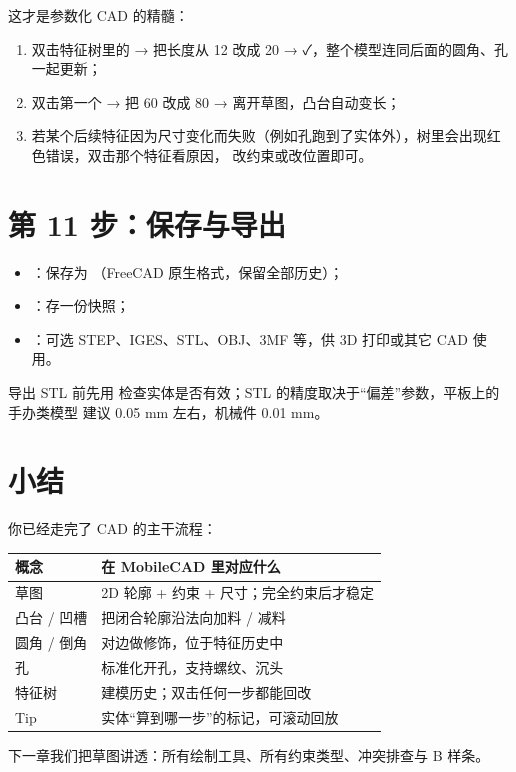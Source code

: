 这才是参数化 CAD 的精髓：

\begin{enumerate}
  \item 双击特征树里的  → 把长度从 12 改成 20 → ✓，整个模型连同后面的圆角、孔一起更新；
  \item 双击第一个  → 把 60 改成 80 → 离开草图，凸台自动变长；
  \item 若某个后续特征因为尺寸变化而失败（例如孔跑到了实体外），树里会出现红色错误，双击那个特征看原因，
        改约束或改位置即可。
\end{enumerate}

\section{第 11 步：保存与导出}

\begin{itemize}
  \item {}：保存为 （FreeCAD 原生格式，保留全部历史）；
  \item {}：存一份快照；
  \item {}：可选 STEP、IGES、STL、OBJ、3MF 等，供 3D 打印或其它 CAD 使用。
\end{itemize}

\begin{tip}[给 3D 打印的建议]
导出 STL 前先用  检查实体是否有效；STL 的精度取决于“偏差”参数，平板上的手办类模型
建议 0.05 mm 左右，机械件 0.01 mm。
\end{tip}

\section{小结}

你已经走完了 CAD 的主干流程：

\begin{center}
\small
\begin{tabularx}{\linewidth}{@{}lX@{}}
\toprule
\textbf{概念} & \textbf{在 MobileCAD 里对应什么} \\
\midrule
草图 & 2D 轮廓 + 约束 + 尺寸；完全约束后才稳定 \\
凸台 / 凹槽 & 把闭合轮廓沿法向加料 / 减料 \\
圆角 / 倒角 & 对边做修饰，位于特征历史中 \\
孔 & 标准化开孔，支持螺纹、沉头 \\
特征树 & 建模历史；双击任何一步都能回改 \\
Tip & 实体“算到哪一步”的标记，可滚动回放 \\
\bottomrule
\end{tabularx}
\end{center}

下一章我们把草图讲透：所有绘制工具、所有约束类型、冲突排查与 B 样条。
